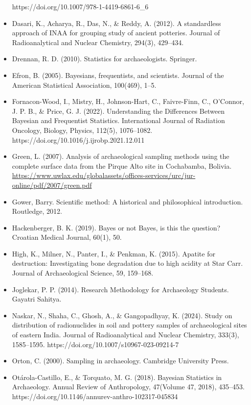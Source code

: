 \documentclass{article}
\begin{document}
\begin{itemize}
    https://doi.org/10.1007/978-1-4419-6861-6\_6
    \item Dasari, K., Acharya, R., Das, N., \& Reddy, A. (2012). A standardless approach of INAA for grouping study of ancient potteries. Journal of Radioanalytical and Nuclear Chemistry, 294(3), 429–434.
    \item Drennan, R. D. (2010). Statistics for archaeologists. Springer.
    \item Efron, B. (2005). Bayesians, frequentists, and scientists. Journal of the American Statistical Association, 100(469), 1–5.
    \item Fornacon-Wood, I., Mistry, H., Johnson-Hart, C., Faivre-Finn, C., O’Connor, J. P. B., \& Price, G. J. (2022). Understanding the Differences Between Bayesian and Frequentist Statistics. International Journal of Radiation Oncology, Biology, Physics, 112(5), 1076–1082. https://doi.org/10.1016/j.ijrobp.2021.12.011
     \item Green, L. (2007). Analysis of archaeological sampling methods using the complete surface data from the Pirque Alto site in Cochabamba, Bolivia. \\
     \href{https://www.uwlax.edu/globalassets/offices-services/urc/jur-online/pdf/2007/green.pdf}{https://www.uwlax.edu/globalassets/offices-services/urc/jur-online/pdf/2007/green.pdf}
    \item Gower, Barry. Scientific method: A historical and philosophical introduction. Routledge, 2012.
    \item Hackenberger, B. K. (2019). Bayes or not Bayes, is this the question? Croatian Medical Journal, 60(1), 50.
    \item High, K., Milner, N., Panter, I., \& Penkman, K. (2015). Apatite for destruction: Investigating bone degradation due to high acidity at Star Carr. Journal of Archaeological Science, 59, 159–168.
    \item Joglekar, P. P. (2014). Research Methodology for Archaeology Students. Gayatri Sahitya.
    \item Naskar, N., Shaha, C., Ghosh, A., \& Gangopadhyay, K. (2024). Study on distribution of radionuclides in soil and pottery samples of archaeological sites of eastern India. Journal of Radioanalytical and Nuclear Chemistry, 333(3), 1585–1595. https://doi.org/10.1007/s10967-023-09214-7
    \item Orton, C. (2000). Sampling in archaeology. Cambridge University Press.
    \item Otárola-Castillo, E., \& Torquato, M. G. (2018). Bayesian Statistics in Archaeology. Annual Review of Anthropology, 47(Volume 47, 2018), 435–453. https://doi.org/10.1146/annurev-anthro-102317-045834

\end{itemize}
\end{document}
